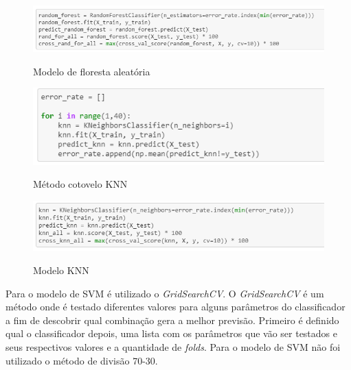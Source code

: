 \begin{figure}[htbp]
  \begin{center}
  \includegraphics[width=1.\linewidth]{imagens/cod_rand_for.png}\\
  \end{center}
  \caption[Modelo de floresta aleatória]{Modelo de floresta aleatória}
  \label{fig:logo}
\end{figure}

\begin{figure}[htbp]
  \begin{center}
  \includegraphics[width=0.8\linewidth]{imagens/cotovelo_knn.png}\\
  \end{center}
  \caption[Método cotovelo KNN]{Método cotovelo KNN}
  \label{fig:logo}
\end{figure}

\begin{figure}[htbp]
  \begin{center}
  \includegraphics[width=1.\linewidth]{imagens/cod_knn.png}\\
  \end{center}
  \caption[Modelo KNN]{Modelo KNN}
  \label{fig:logo}
\end{figure}
	
	\break
	Para o modelo de SVM é utilizado o \textit{GridSearchCV}. O \textit{GridSearchCV} é um método onde é testado diferentes valores para alguns parâmetros do classificador a fim de descobrir qual combinação gera a melhor previsão. Primeiro é definido qual o classificador depois, uma lista com os parâmetros que vão ser testados e seus respectivos valores e a quantidade de \textit{folds}. Para o modelo de SVM não foi utilizado o método de divisão 70-30.
	
